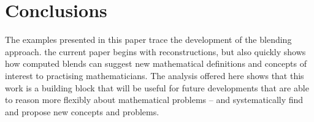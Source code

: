\section{Conclusions}
\label{sec:conc}

The examples presented in this paper trace the development of the
blending approach.
the current paper begins with reconstructions, but also
quickly shows how computed blends can suggest new mathematical
definitions and concepts of interest to practising mathematicians.
The analysis offered here shows that this work is a building block that
will be useful for future developments that are able to reason more
flexibly about mathematical problems -- and systematically find and
propose new concepts and problems.


